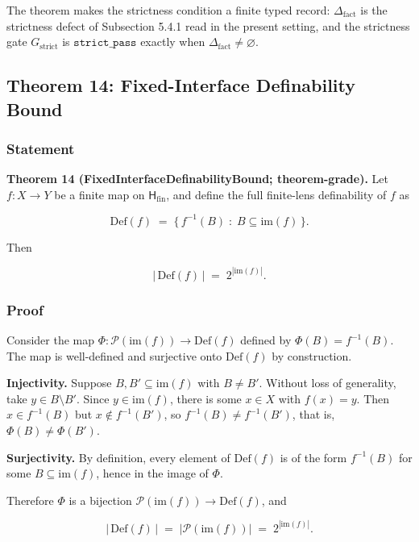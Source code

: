 \documentclass[11pt]{article}
\theoremstyle{definition}
\begin{document}
The theorem makes the strictness condition a finite typed record: \(\Delta_{\mathrm{fact}}\) is the strictness defect of Subsection 5.4.1 read in the present setting, and the strictness gate \(G_{\mathrm{strict}}\) is \(\texttt{strict\_pass}\) exactly when \(\Delta_{\mathrm{fact}}\neq\varnothing\).

\subsection{Theorem 14: Fixed-Interface Definability Bound}

\subsubsection{Statement}

\textbf{Theorem 14 (FixedInterfaceDefinabilityBound; theorem-grade).} Let \(f:X\to Y\) be a finite map on \(\mathsf H_{\mathrm{fin}}\), and define the full finite-lens definability of \(f\) as

\[
\mathrm{Def}(f)\;=\;\{\,f^{-1}(B)\;:\;B\subseteq\mathrm{im}(f)\,\}.
\]

Then

\[
|\,\mathrm{Def}(f)\,|\;=\;2^{|\mathrm{im}(f)|}.
\]

\subsubsection{Proof}

Consider the map \(\Phi:\mathcal P(\mathrm{im}(f))\to\mathrm{Def}(f)\) defined by \(\Phi(B)=f^{-1}(B)\). The map is well-defined and surjective onto \(\mathrm{Def}(f)\) by construction.

\textbf{Injectivity.} Suppose \(B,B'\subseteq\mathrm{im}(f)\) with \(B\neq B'\). Without loss of generality, take \(y\in B\setminus B'\). Since \(y\in\mathrm{im}(f)\), there is some \(x\in X\) with \(f(x)=y\). Then \(x\in f^{-1}(B)\) but \(x\notin f^{-1}(B')\), so \(f^{-1}(B)\neq f^{-1}(B')\), that is, \(\Phi(B)\neq\Phi(B')\).

\textbf{Surjectivity.} By definition, every element of \(\mathrm{Def}(f)\) is of the form \(f^{-1}(B)\) for some \(B\subseteq\mathrm{im}(f)\), hence in the image of \(\Phi\).

Therefore \(\Phi\) is a bijection \(\mathcal P(\mathrm{im}(f))\to\mathrm{Def}(f)\), and

\[
|\,\mathrm{Def}(f)\,|\;=\;|\mathcal P(\mathrm{im}(f))|\;=\;2^{|\mathrm{im}(f)|}.
\]
\end{document}

